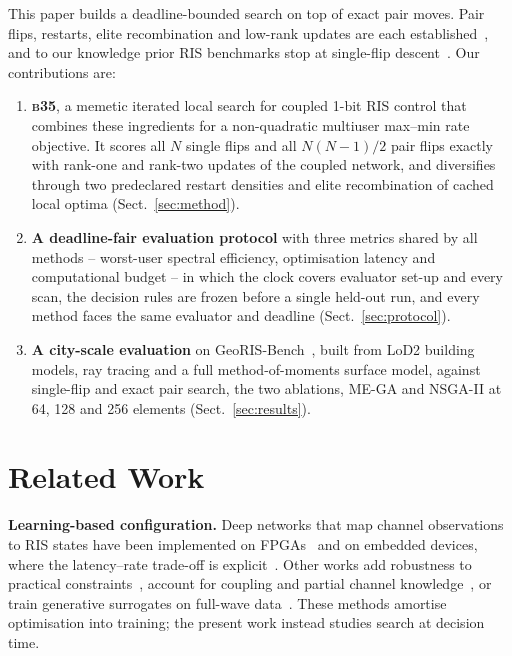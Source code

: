 \documentclass[runningheads]{llncs}
\newcommand{\bts}{\textsc{b35}}
\begin{document}
This paper builds a deadline-bounded search on top of exact pair moves. Pair flips, restarts, elite recombination and low-rank updates are each established~\cite{merz2002bqp,lourenco2010ils,merz2004memetic,prodhomme2023efficient}, and to our knowledge prior RIS benchmarks stop at single-flip descent~\cite{hammami2026statistical}. Our contributions are:
\begin{enumerate}
\item \textbf{\bts{}}, a memetic iterated local search for coupled 1-bit RIS control that combines these ingredients for a non-quadratic multiuser max--min rate objective. It scores all $N$ single flips and all $N(N-1)/2$ pair flips exactly with rank-one and rank-two updates of the coupled network, and diversifies through two predeclared restart densities and elite recombination of cached local optima (Sect.~\ref{sec:method}).
\item \textbf{A deadline-fair evaluation protocol} with three metrics shared by all methods -- worst-user spectral efficiency, optimisation latency and computational budget -- in which the clock covers evaluator set-up and every scan, the decision rules are frozen before a single held-out run, and every method faces the same evaluator and deadline (Sect.~\ref{sec:protocol}).
\item \textbf{A city-scale evaluation} on GeoRIS-Bench~\cite{georisbench}, built from LoD2 building models, ray tracing and a full method-of-moments surface model, against single-flip and exact pair search, the two ablations, ME-GA and NSGA-II at 64, 128 and 256 elements (Sect.~\ref{sec:results}).
\end{enumerate}

\section{Related Work}\label{sec:related}
\textbf{Learning-based configuration.} Deep networks that map channel observations to RIS states have been implemented on FPGAs~\cite{martin2024hardware,padial2026accelerating} and on embedded devices, where the latency--rate trade-off is explicit~\cite{urbinati2026ondevice}. Other works add robustness to practical constraints~\cite{xu2022robust}, account for coupling and partial channel knowledge~\cite{peng2025risnet}, or train generative surrogates on full-wave data~\cite{liu2026physics}. These methods amortise optimisation into training; the present work instead studies search at decision time.
\end{document}
